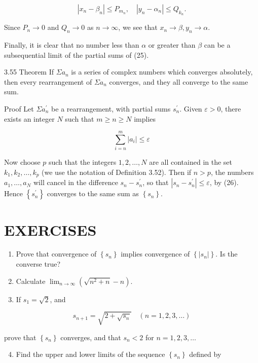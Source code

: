 \documentclass[10pt]{article}
\begin{document}
$$
\left|x_{n}-\beta_{n}\right| \leq P_{m_{n}}, \quad\left|y_{n}-\alpha_{n}\right| \leq Q_{k_{n}} .
$$

Since $P_{n} \rightarrow 0$ and $Q_{n} \rightarrow 0$ as $n \rightarrow \infty$, we see that $x_{n} \rightarrow \beta, y_{n} \rightarrow \alpha$.

Finally, it is clear that no number less than $\alpha$ or greater than $\beta$ can be a subsequential limit of the partial sums of (25).

3.55 Theorem If $\Sigma a_{n}$ is a series of complex numbers which converges absolutely, then every rearrangement of $\Sigma a_{n}$ converges, and they all converge to the same sum.

Proof Let $\Sigma a_{n}^{\prime}$ be a rearrangement, with partial sums $s_{n}^{\prime}$. Given $\varepsilon>0$, there exists an integer $N$ such that $m \geq n \geq N$ implies

$$
\sum_{i=n}^{m}\left|a_{i}\right| \leq \varepsilon
$$

Now choose $p$ such that the integers $1,2, \ldots, N$ are all contained in the set $k_{1}, k_{2}, \ldots, k_{p}$ (we use the notation of Definition 3.52). Then if $n>p$, the numbers $a_{1}, \ldots, a_{N}$ will cancel in the difference $s_{n}-s_{n}^{\prime}$, so that $\left|s_{n}-s_{n}^{\prime}\right| \leq \varepsilon$, by (26). Hence $\left\{s_{n}^{\prime}\right\}$ converges to the same sum as $\left\{s_{n}\right\}$.

\section{EXERCISES}
\begin{enumerate}
  \item Prove that convergence of $\left\{s_{n}\right\}$ implies convergence of $\left\{\left|s_{n}\right|\right\}$. Is the converse true?

  \item Calculate $\lim _{n \rightarrow \infty}\left(\sqrt{n^{2}+n}-n\right)$.

  \item If $s_{1}=\sqrt{2}$, and

\end{enumerate}

$$
s_{n+1}=\sqrt{2+\sqrt{s_{n}}} \quad(n=1,2,3, \ldots)
$$

prove that $\left\{s_{n}\right\}$ converges, and that $s_{n}<2$ for $n=1,2,3, \ldots$

\begin{enumerate}
  \setcounter{enumi}{3}
  \item Find the upper and lower limits of the sequence $\left\{s_{n}\right\}$ defined by
\end{enumerate}
\end{document}
